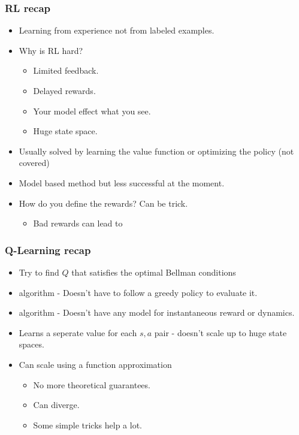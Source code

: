 \documentclass[handout]{beamer}
\begin{document}
\begin{frame}\frametitle{RL recap}\small

\begin{itemize}
	\item Learning from experience not from labeled examples.
	\onslide<2->\item Why is RL hard?
	\begin{itemize}
		\item Limited feedback.
		\onslide<4->\item Delayed rewards.
		\onslide<5->\item Your model effect what you
		 see.
		\onslide<6->\item Huge state space.
	\end{itemize}
	 \item Usually solved by learning the value function or optimizing the policy (not covered)
	\onslide<8-> \item Model based method but less successful at the moment.
	\onslide<9-> \item How do you define the rewards? Can be trick.
	\begin{itemize}
		\item Bad rewards can lead to 
	\end{itemize}
	
\end{itemize}

\end{frame}

\begin{frame}\frametitle{Q-Learning recap}\small

\begin{itemize}
	\item Try to find $Q$ that satisfies the optimal Bellman conditions
	\onslide<2->\item {} algorithm - Doesn't have to follow a greedy policy to evaluate it.
	\onslide<3->\item {} algorithm - Doesn't have any model for instantaneous reward or dynamics.
	\onslide<4->\item Learns a seperate value for each $s,a$ pair - doesn't scale up to huge state spaces.
	\onslide<5->\item Can scale using a function approximation
	\begin{itemize}
		\item No more theoretical guarantees.
		\item Can diverge. 
		\item Some simple tricks help a lot.
	\end{itemize}
	
	
\end{itemize}

\end{frame}
\end{document}
